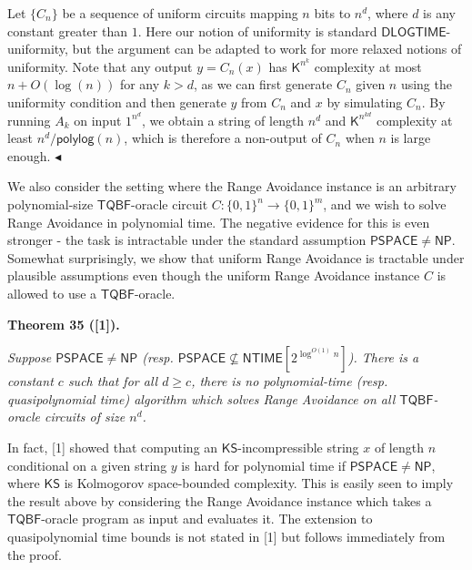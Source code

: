 Let $\{C_{n}\}$ be a sequence of uniform circuits mapping $n$ bits to $n^{d}$, where $d$ is any constant greater than $1$. Here our notion of uniformity is standard $\mathsf{DLOGTIME}$-uniformity, but the argument can be adapted to work for more relaxed notions of uniformity. Note that any output $y=C_{n}(x)$ has ${\mathsf{K}}^{n^{k}}$ complexity at most $n+O(\log(n))$ for any $k>d$, as we can first generate $C_{n}$ given $n$ using the uniformity condition and then generate $y$ from $C_{n}$ and $x$ by simulating $C_{n}$. By running $A_{k}$ on input $1^{n^{d}}$, we obtain a string of length $n^{d}$ and ${\mathsf{K}}^{n^{kd}}$ complexity at least $n^{d}/{\mathsf{polylog}}(n)$, which is therefore a non-output of $C_{n}$ when $n$ is large enough.
$\blacktriangleleft$\par




We also consider the setting where the Range Avoidance instance is an arbitrary polynomial-size $\mathsf{TQBF}$-oracle circuit $C:\{0,1\}^{n}\to\{0,1\}^{m}$, and we wish to solve Range Avoidance in polynomial time. The negative evidence for this is even stronger - the task is intractable under the standard assumption ${\mathsf{PSPACE}}\neq{\mathsf{NP}}$. Somewhat surprisingly, we show that uniform Range Avoidance is tractable under plausible assumptions even though the uniform Range Avoidance instance $C$ is allowed to use a $\mathsf{TQBF}$-oracle.\par





\par\medskip\noindent\textbf{
\textbf{Theorem 35}\textbf{ }([1])\textbf{.}
}\par



\emph{Suppose ${\mathsf{PSPACE}}\neq{\mathsf{NP}}$ (resp. ${\mathsf{PSPACE}}\not\subseteq{\mathsf{NTIME}}[2^{\log^{O(1)}n}]$).
There is a constant $c$ such that for all $d\geq c$, there is no polynomial-time (resp. quasipolynomial time) algorithm which solves Range Avoidance on all $\mathsf{TQBF}$-oracle circuits of size $n^{d}$.}\par






In fact, [1] showed that computing an $\mathsf{KS}$-incompressible string $x$ of length $n$ conditional on a given string $y$ is hard for polynomial time if $\mathsf{PSPACE}\neq{\mathsf{NP}}$, where $\mathsf{KS}$ is Kolmogorov space-bounded complexity. This is easily seen to imply the result above by considering the Range Avoidance instance which takes a $\mathsf{TQBF}$-oracle program as input and evaluates it. The extension to quasipolynomial time bounds is not stated in [1] but follows immediately from the proof.\par



